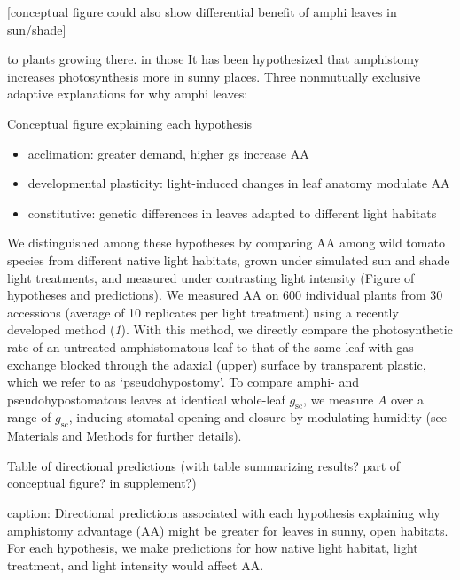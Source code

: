 \documentclass[
  letterpaper,
  DIV=11,
  numbers=noendperiod]{scrartcl}
\providecommand{\tightlist}{%
  \setlength{\itemsep}{0pt}\setlength{\parskip}{0pt}}\usepackage{longtable,booktabs,array}
\begin{document}
{[}conceptual figure could also show differential benefit of amphi
leaves in sun/shade{]}

to plants growing there. in those It has been hypothesized that
amphistomy increases photosynthesis more in sunny places. Three
nonmutually exclusive adaptive explanations for why amphi leaves:

Conceptual figure explaining each hypothesis

\begin{itemize}
\tightlist
\item
  acclimation: greater demand, higher gs increase AA
\item
  developmental plasticity: light-induced changes in leaf anatomy
  modulate AA
\item
  constitutive: genetic differences in leaves adapted to different light
  habitats
\end{itemize}

We distinguished among these hypotheses by comparing AA among wild
tomato species from different native light habitats, grown under
simulated sun and shade light treatments, and measured under contrasting
light intensity (Figure of hypotheses and predictions). We measured AA
on 600 individual plants from 30 accessions (average of 10 replicates
per light treatment) using a recently developed method (\emph{1}). With
this method, we directly compare the photosynthetic rate of an untreated
amphistomatous leaf to that of the same leaf with gas exchange blocked
through the adaxial (upper) surface by transparent plastic, which we
refer to as `pseudohypostomy'. To compare amphi- and pseudohypostomatous
leaves at identical whole-leaf \(g_\text{sc}\), we measure \(A\) over a
range of \(g_\text{sc}\), inducing stomatal opening and closure by
modulating humidity (see Materials and Methods for further details).

Table of directional predictions (with table summarizing results? part
of conceptual figure? in supplement?)

caption: Directional predictions associated with each hypothesis
explaining why amphistomy advantage (AA) might be greater for leaves in
sunny, open habitats. For each hypothesis, we make predictions for how
native light habitat, light treatment, and light intensity would affect
AA.
\end{document}
